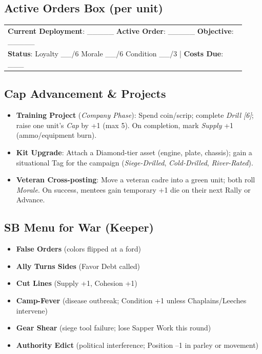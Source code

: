 \documentclass[11pt]{article}
\begin{document}
\subsection{Active Orders Box (per unit)}
\begin{center}\small
\begin{longtable}{p{0.92\linewidth}}
\toprule
\textbf{Current Deployment}: \_\_\_\_\_ \quad \textbf{Active Order}: \_\_\_\_\_ \quad \textbf{Objective}: \_\_\_\_\_ \\
\textbf{Status}: Loyalty \_\_/6 \; Morale \_\_/6 \; Condition \_\_/3 \;\;|\;\; \textbf{Costs Due}: \_\_\_ \\
\bottomrule
\end{longtable}
\end{center}

\subsection{Cap Advancement \& Projects}\label{s:cap-advancement}
\begin{itemize}[leftmargin=*]
  \item \textbf{Training Project} (\emph{Company Phase}): Spend coin/scrip; complete \emph{Drill [6]}; raise one unit's \emph{Cap} by +1 (max 5). On completion, mark \emph{Supply} +1 (ammo/equipment burn).
  \item \textbf{Kit Upgrade}: Attach a Diamond-tier asset (engine, plate, chassis); gain a situational Tag for the campaign (\emph{Siege-Drilled}, \emph{Cold-Drilled}, \emph{River-Rated}).
  \item \textbf{Veteran Cross-posting}: Move a veteran cadre into a green unit; both roll \emph{Morale}. On success, mentees gain temporary +1 die on their next Rally or Advance.
\end{itemize}

\subsection{SB Menu for War (Keeper)}
\begin{itemize}[leftmargin=*]
  \item \textbf{False Orders} (colors flipped at a ford)
  \item \textbf{Ally Turns Sides} (Favor Debt called)
  \item \textbf{Cut Lines} (Supply +1, Cohesion +1)
  \item \textbf{Camp-Fever} (disease outbreak; Condition +1 unless Chaplains/Leeches intervene)
  \item \textbf{Gear Shear} (siege tool failure; lose Sapper Work this round)
  \item \textbf{Authority Edict} (political interference; Position --1 in parley or movement)
\end{itemize}
\end{document}
